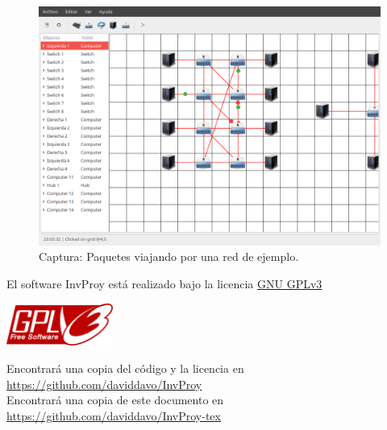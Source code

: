 \documentclass[a4paper, 11pt]{report} %
\begin{document}
\begin{figure}[H]
\includegraphics[width=\textwidth]{Resources/Screenshots/2016-09-12-230644_1000x700_scrot.png}
\caption{Captura: Paquetes viajando por una red de ejemplo.}
\label{fig:samplenet}
\end{figure}

%

\newpage
\thispagestyle{empty}
\vspace*{2cm}
\doclicenseThis

\noindent
\begin{minipage}{0.7\textwidth}
\noindent El software InvProy está realizado bajo la licencia \href{https://www.gnu.org/licenses/quick-guide-gplv3.html}{GNU GPLv3}
\end{minipage}
\hspace*{\fill}
\begin{minipage}{0.3\textwidth}
\hspace*{\fill}
\includegraphics[height=1.4cm]{Resources/gplv3-127x51.png}
\end{minipage}

\noindent
Encontrará una copia del código y la licencia en \url{https://github.com/daviddavo/InvProy} \\
Encontrará una copia de este documento en \url{https://github.com/daviddavo/InvProy-tex}\\
\end{document}
